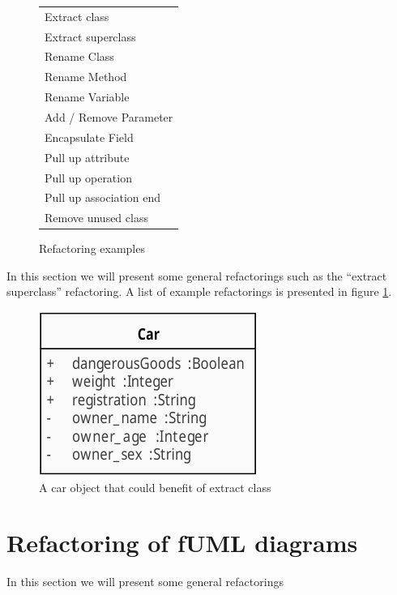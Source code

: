 \documentclass{llncs}
\begin{document}
\begin{figure}
 \centering
 \begin{tabular}[]{l}
  \hline
  Extract class\\
  Extract superclass\\
  Rename Class\\
  Rename Method\\
  Rename Variable\\
  Add / Remove Parameter\\
  Encapsulate Field\\
  Pull up attribute\\
  Pull up operation\\
  Pull up association end\\
  Remove unused class\\
  \hline
 \end{tabular}
 \caption{Refactoring examples}
 \label{fig:refactoringlist}
\end{figure}

In this section we will present some general refactorings such as the ``extract superclass'' refactoring. A list of example refactorings
is presented in figure \ref{fig:refactoringlist}.




\begin{figure}[ht]
 \centering
 \includegraphics{images/ComplexCar-class_diagram.pdf}
 \caption{A car object that could benefit of extract class}
 \label{fig:complexcar}
\end{figure}


\section{Refactoring of fUML diagrams}
\label{sec:fuml-refactoring}
In this section we will present some general refactorings
\end{document}
